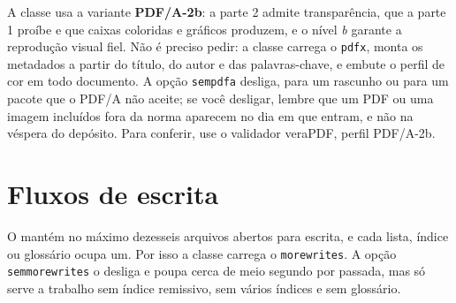 \documentclass[dsc]{ufrj}
\begin{document}
  A classe usa a variante \textbf{PDF/A-2b}: a parte 2 admite transparência,
  que a parte 1 proíbe e que caixas coloridas e gráficos produzem, e o nível
  \emph{b} garante a reprodução visual fiel. Não é preciso pedir: a classe
  carrega o \texttt{pdfx}, monta os metadados a partir do título, do autor e
  das palavras-chave, e embute o perfil de cor em todo documento. A opção
  \texttt{sempdfa} desliga, para um rascunho ou para um pacote que o PDF/A não
  aceite; se você desligar, lembre que um PDF ou uma imagem incluídos fora da
  norma aparecem no dia em que entram, e não na véspera do depósito. Para conferir, use o validador veraPDF, perfil PDF/A-2b.

  \section{Fluxos de escrita}
  O  mantém no máximo dezesseis arquivos abertos para escrita,
  e cada lista, índice ou glossário ocupa um. Por isso a classe carrega o
  \texttt{morewrites}. A opção \texttt{semmorewrites} o desliga e poupa cerca de
  meio segundo por passada, mas só serve a trabalho sem índice remissivo, sem
  vários índices e sem glossário.
\end{document}
